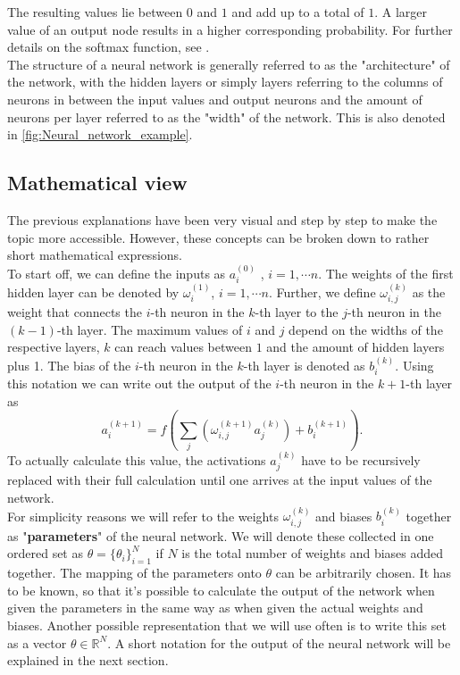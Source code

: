 The resulting values lie between $0$ and $1$ and add up to a total of $1$. A larger value of an output node results in a higher corresponding probability. For further details on the softmax function, see \cite{gao2018properties}.\\
The structure of a neural network is generally referred to as the "architecture" of the network, with the hidden layers or simply layers referring to the columns of neurons in between the input values and output neurons and the amount of neurons per layer referred to as the "width" of the network. This is also denoted in \cref{fig:Neural_network_example}. 
\subsection{Mathematical view}
The previous explanations have been very visual and step by step to make the topic more accessible. However, these concepts can be broken down to rather short mathematical expressions.\\
To start off, we can define the inputs as $a_i^{(0)}$ , $i =  1, \dotsb n$. The weights of the first hidden layer can be denoted by $\omega_{i}^{(1)}$, $i =  1, \dotsb n$. Further, we define $\omega_{i,j}^{(k)}$ as the weight that connects the $i$-th neuron in the $k$-th layer to the $j$-th neuron in the $(k-1)$-th layer. The maximum values of $i$ and $j$ depend on the widths of the respective layers, $k$ can reach values between $1$ and the amount of hidden layers plus 1. The bias of the $i$-th neuron in the $k$-th layer is denoted as $b_i^{(k)}$. Using this notation we can write out the output of the $i$-th neuron in the $k+1$-th layer as
\begin{equation}
	a_i^{(k+1)} = f\left(\sum_j \left(\omega_{i,j}^{(k+1)}a_j^{(k)}\right) + b_i^{(k+1)}\right).
\end{equation}
To actually calculate this value, the activations $a_j^{(k)}$ have to be recursively replaced with their full calculation until one arrives at the input values of the network.\\
For simplicity reasons we will refer to the weights $\omega_{i,j}^{(k)}$ and biases $b_i^{(k)}$ together as "\textbf{parameters}" of the neural network. We will denote these collected in one ordered set as $\theta = \{\theta_i\}_{i=1}^{N}$ if $N$ is the total number of weights and biases added together. The mapping of the parameters onto $\theta$ can be arbitrarily chosen. It has to be known, so that it's possible to calculate the output of the network when given the parameters in the same way as when given the actual weights and biases. Another possible representation that we will use often is to write this set as a vector $\theta \in \mathbb{R}^N$. A short notation for the output of the neural network will be explained in the next section.
